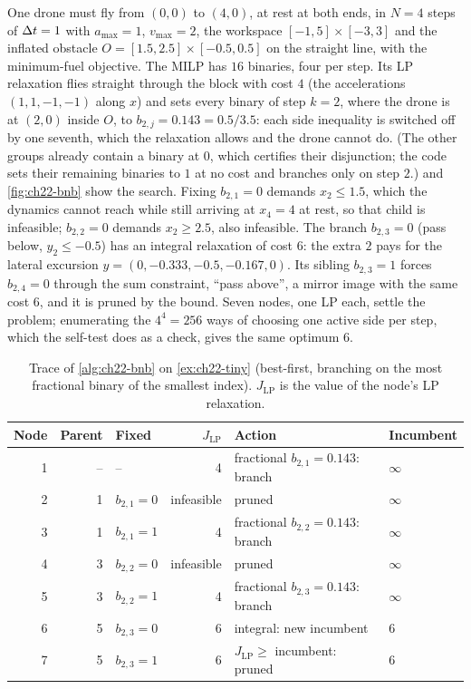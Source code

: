 \begin{example}
\label{ex:ch22-tiny}
One drone must fly from $(0,0)$ to $(4,0)$, at rest at both ends, in $N = 4$
steps of $\Delta t = 1$ with $a_{\max} = 1$, $v_{\max} = 2$, the workspace
$[-1,5] \times [-3,3]$ and the inflated obstacle $O = [1.5, 2.5] \times
[-0.5, 0.5]$ on the straight line, with the minimum-fuel objective. The MILP
has $16$ binaries, four per step. Its LP relaxation flies straight through
the block with cost $4$ (the accelerations $(1,1,-1,-1)$ along $x$) and sets
every binary of step $k = 2$, where the drone is at $(2,0)$ inside $O$, to
$b_{2,j} = 0.143 = 0.5/3.5$: each side inequality is switched off by one
seventh, which the relaxation allows and the drone cannot do. (The other
groups already contain a binary at $0$, which certifies their disjunction;
the code sets their remaining binaries to $1$ at no cost and branches only
on step $2$.)  and \cref{fig:ch22-bnb} show the search. Fixing $b_{2,1} = 0$ demands
$x_2 \le 1.5$, which the dynamics cannot reach while still arriving at $x_4 =
4$ at rest, so that child is infeasible; $b_{2,2} = 0$ demands $x_2 \ge 2.5$,
also infeasible. The branch $b_{2,3} = 0$ (pass below, $y_2 \le -0.5$) has an
integral relaxation of cost $6$: the extra $2$ pays for the lateral
excursion $y = (0, -0.333, -0.5, -0.167, 0)$. Its sibling $b_{2,3} = 1$
forces $b_{2,4} = 0$ through the sum constraint, ``pass above'', a mirror
image with the same cost $6$, and it is pruned by the bound. Seven nodes, one LP
each, settle the problem; enumerating the $4^4 = 256$ ways of choosing one
active side per step, which the self-test does as a check, gives the same
optimum $6$.
\end{example}

\begin{table}[tb]
  \centering\small
  \caption{Trace of \cref{alg:ch22-bnb} on \cref{ex:ch22-tiny} (best-first,
  branching on the most fractional binary of the smallest index). $J_{\mathrm{LP}}$
  is the value of the node's LP relaxation.}
  \label{tab:ch22-trace}
  \begin{tabular}{@{}rrlrll@{}}
  \toprule
  Node & Parent & Fixed & $J_{\mathrm{LP}}$ & Action & Incumbent\\
  \midrule
  1 & -- & -- & 4 & fractional $b_{2,1} = 0.143$: branch & $\infty$\\
  2 & 1 & $b_{2,1} = 0$ & infeasible & pruned & $\infty$\\
  3 & 1 & $b_{2,1} = 1$ & 4 & fractional $b_{2,2} = 0.143$: branch & $\infty$\\
  4 & 3 & $b_{2,2} = 0$ & infeasible & pruned & $\infty$\\
  5 & 3 & $b_{2,2} = 1$ & 4 & fractional $b_{2,3} = 0.143$: branch & $\infty$\\
  6 & 5 & $b_{2,3} = 0$ & 6 & integral: new incumbent & 6\\
  7 & 5 & $b_{2,3} = 1$ & 6 & $J_{\mathrm{LP}} \ge$ incumbent: pruned & 6\\
  \bottomrule
  \end{tabular}
\end{table}

